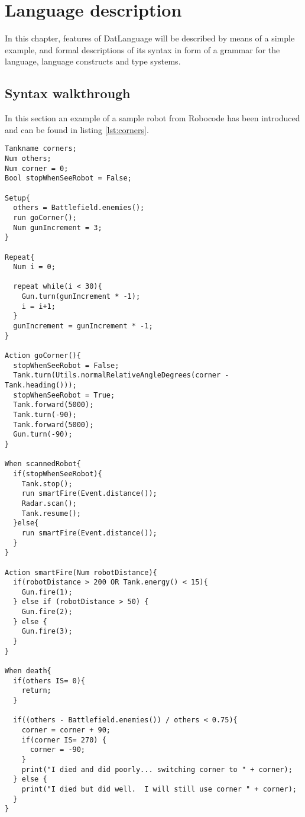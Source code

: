 \chapter{Language description}
\label{chap:LanguageDescription}
In this chapter, features of DatLanguage will be described by means of a simple example, and formal descriptions of its syntax in form of a grammar for the language, language constructs and type systems. 

\section{Syntax walkthrough}
In this section an example of a sample robot from Robocode has been introduced and can be found in listing \ref{lst:corners}.

\begin{lstlisting}[caption={Example of the sample robot "Corners" in our language}, label={lst:corners}]
Tankname corners;
Num others;
Num corner = 0;
Bool stopWhenSeeRobot = False;

Setup{
  others = Battlefield.enemies();  
  run goCorner();	 
  Num gunIncrement = 3;
}

Repeat{  
  Num i = 0;
  
  repeat while(i < 30){
    Gun.turn(gunIncrement * -1);
    i = i+1;
  }  
  gunIncrement = gunIncrement * -1;
}

Action goCorner(){
  stopWhenSeeRobot = False;  
  Tank.turn(Utils.normalRelativeAngleDegrees(corner - Tank.heading()));      
  stopWhenSeeRobot = True;
  Tank.forward(5000);
  Tank.turn(-90);
  Tank.forward(5000);
  Gun.turn(-90);
}

When scannedRobot{
  if(stopWhenSeeRobot){
    Tank.stop();                                     
    run smartFire(Event.distance());
    Radar.scan();                                     
    Tank.resume();                                   
  }else{
    run smartFire(Event.distance());
  }
}

Action smartFire(Num robotDistance){
  if(robotDistance > 200 OR Tank.energy() < 15){
    Gun.fire(1);
  } else if (robotDistance > 50) {
    Gun.fire(2);
  } else {
    Gun.fire(3);
  }
}

When death{
  if(others IS= 0){
    return;
  }
  
  if((others - Battlefield.enemies()) / others < 0.75){
    corner = corner + 90;
    if(corner IS= 270) {
      corner = -90;
    }
    print("I died and did poorly... switching corner to " + corner);
  } else {
    print("I died but did well.  I will still use corner " + corner);
  }
}
\end{lstlisting}

